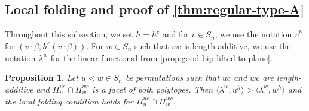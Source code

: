\documentclass[11pt]{amsart}
\newtheorem{proposition}[Thm]{Proposition}
\theoremstyle{definition}
\def\lin{\lambda}
\def\hgt{h}
\def\hc{\hgt^c}
\def\pt{\beta}
\begin{document}
\subsection{Local folding and proof of \cref{thm:regular-type-A}}

Throughout this subsection, we set $\hgt=\hc$ and for $v \in S_n$, we use the notation $v^{\hgt}$ for $(v \cdot \pt, \hc(v \cdot \pt))$. For $w \in S_n$ such that $wc$ is length-additive, we use the notation $\lin^w$ for the linear functional from \cref{prop:good-bip-lifted-to-plane}.

\begin{proposition}\label{prop:good-bip-lifted-distinct-planes}
	Let $u\lessdot w \in S_n$ be permutations such that $uc$ and $wc$ are length-additive and $\Pi_u ^{uc} \cap \Pi_w^{wc}$ is a facet of both polytopes. Then $\langle \lin^w, u^{\hgt} \rangle > \langle \lin^w, w^{\hgt} \rangle$ 
and the local folding condition holds for $\Pi_u ^{uc} \cap \Pi_w^{wc}$.
\end{proposition}
\end{document}
